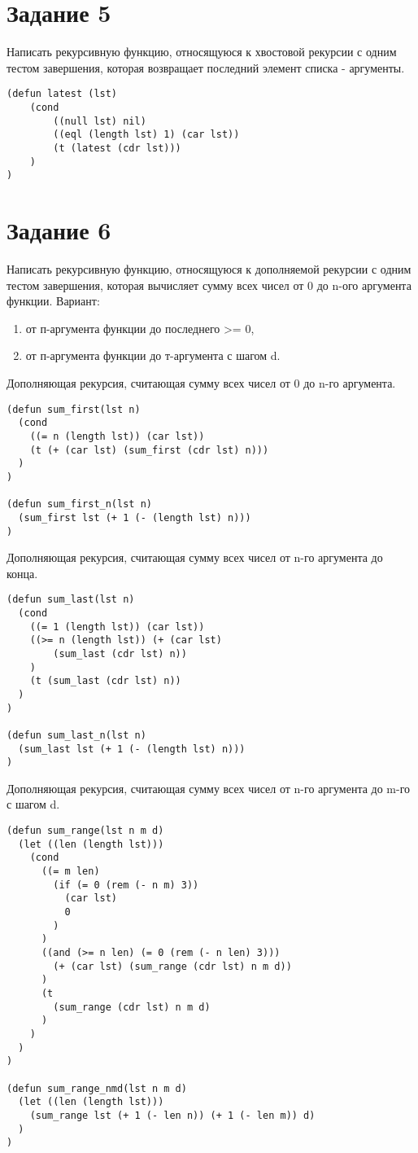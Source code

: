\section{Задание \No{}5}

Написать рекурсивную функцию, относящуюся к хвостовой рекурсии с одним тестом завершения, которая возвращает последний элемент списка - аргументы.

\begin{lstlisting}
(defun latest (lst)
    (cond
        ((null lst) nil)
        ((eql (length lst) 1) (car lst))
        (t (latest (cdr lst)))
    )
)
\end{lstlisting}

\section{Задание \No{}6}

Написать рекурсивную функцию, относящуюся к дополняемой рекурсии с
одним тестом завершения, которая вычисляет сумму всех чисел от 0 до n-ого аргумента функции.
Вариант:
\begin{enumerate}
    \item  от п-аргумента функции до последнего >= 0,
    \item  от п-аргумента функции до т-аргумента с шагом d.
\end{enumerate}

Дополняющая рекурсия, считающая сумму всех чисел от 0 до n-го аргумента.
\begin{lstlisting}
(defun sum_first(lst n)
  (cond
    ((= n (length lst)) (car lst))
    (t (+ (car lst) (sum_first (cdr lst) n)))
  )
)

(defun sum_first_n(lst n)
  (sum_first lst (+ 1 (- (length lst) n)))
)
\end{lstlisting}

Дополняющая рекурсия, считающая сумму всех чисел от n-го аргумента до конца.
\begin{lstlisting}
(defun sum_last(lst n)
  (cond
    ((= 1 (length lst)) (car lst))
    ((>= n (length lst)) (+ (car lst)
    	(sum_last (cdr lst) n))
    )
    (t (sum_last (cdr lst) n))
  )
)

(defun sum_last_n(lst n)
  (sum_last lst (+ 1 (- (length lst) n)))
)
\end{lstlisting}

Дополняющая рекурсия, считающая сумму всех чисел от n-го аргумента до m-го с шагом d.
\begin{lstlisting}
(defun sum_range(lst n m d)
  (let ((len (length lst)))
    (cond
      ((= m len)
        (if (= 0 (rem (- n m) 3))
          (car lst)
          0
        )
      )
      ((and (>= n len) (= 0 (rem (- n len) 3)))
        (+ (car lst) (sum_range (cdr lst) n m d))
      )
      (t
        (sum_range (cdr lst) n m d)
      )
    )
  )
)

(defun sum_range_nmd(lst n m d)
  (let ((len (length lst)))
    (sum_range lst (+ 1 (- len n)) (+ 1 (- len m)) d)
  )
)
\end{lstlisting}

